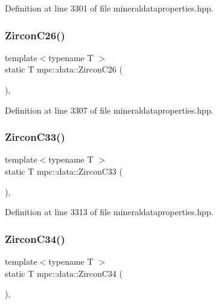 Definition at line 3301 of file mineraldataproperties.\+hpp.

\mbox{\label{namespacempc_1_1data_aee1b4e21b304eaf673a42ec3ac72d312}} 
\subsubsection{\texorpdfstring{Zircon\+C26()}{ZirconC26()}}
{\footnotesize\ttfamily template$<$typename T $>$ \\
static T mpc\+::data\+::\+Zircon\+C26 (\begin{DoxyParamCaption}{ }\end{DoxyParamCaption})\hspace{0.3cm}{\ttfamily [inline]}, {\ttfamily [static]}}



Definition at line 3307 of file mineraldataproperties.\+hpp.

\mbox{\label{namespacempc_1_1data_ac37e71ded14d5d24a6a2c0c7803eab39}} 
\subsubsection{\texorpdfstring{Zircon\+C33()}{ZirconC33()}}
{\footnotesize\ttfamily template$<$typename T $>$ \\
static T mpc\+::data\+::\+Zircon\+C33 (\begin{DoxyParamCaption}{ }\end{DoxyParamCaption})\hspace{0.3cm}{\ttfamily [inline]}, {\ttfamily [static]}}



Definition at line 3313 of file mineraldataproperties.\+hpp.

\mbox{\label{namespacempc_1_1data_a4e31283b4a6d3fa5ad26a53eaadb5330}} 
\subsubsection{\texorpdfstring{Zircon\+C34()}{ZirconC34()}}
{\footnotesize\ttfamily template$<$typename T $>$ \\
static T mpc\+::data\+::\+Zircon\+C34 (\begin{DoxyParamCaption}{ }\end{DoxyParamCaption})\hspace{0.3cm}{\ttfamily [inline]}, {\ttfamily [static]}}



